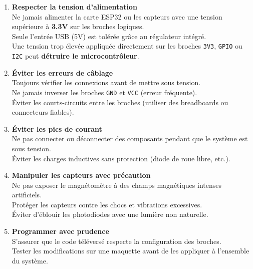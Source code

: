 \documentclass[a4paper,12pt]{article}
\begin{document}
\begin{enumerate}[label=\textbf{\arabic*.}, leftmargin=1.5cm]
    \item \textbf{Respecter la tension d’alimentation} \\
    Ne jamais alimenter la carte ESP32 ou les capteurs avec une tension supérieure à \textbf{3.3V} sur les broches logiques. \\
    Seule l’entrée USB (5V) est tolérée grâce au régulateur intégré. \\
    Une tension trop élevée appliquée directement sur les broches \texttt{3V3}, \texttt{GPIO} ou \texttt{I2C} peut \textbf{détruire le microcontrôleur}.\\[0.3cm]
    
    \item \textbf{Éviter les erreurs de câblage} \\
    Toujours vérifier les connexions avant de mettre sous tension. \\
    Ne jamais inverser les broches \texttt{GND} et \texttt{VCC} (erreur fréquente). \\
    Éviter les courts-circuits entre les broches (utiliser des breadboards ou connecteurs fiables).\\[0.3cm]
    
    \item \textbf{Éviter les pics de courant} \\
    Ne pas connecter ou déconnecter des composants pendant que le système est sous tension. \\
    Éviter les charges inductives sans protection (diode de roue libre, etc.).\\[0.3cm]
    
    \item \textbf{Manipuler les capteurs avec précaution} \\
    Ne pas exposer le magnétomètre à des champs magnétiques intenses artificiels. \\
    Protéger les capteurs contre les chocs et vibrations excessives. \\
    Éviter d'éblouir les photodiodes avec une lumière non naturelle.\\[0.3cm]
    
    \item \textbf{Programmer avec prudence} \\
    S'assurer que le code téléversé respecte la configuration des broches. \\
    Tester les modifications sur une maquette avant de les appliquer à l’ensemble du système.\\[0.3cm]
\end{enumerate}
\end{document}
